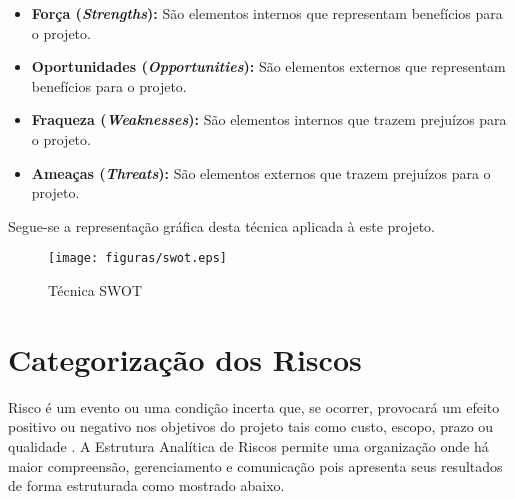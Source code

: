 \begin{itemize}
  \item \textbf{Força (\textit{Strengths}):} São elementos internos que representam benefícios para o projeto.
  \item \textbf{Oportunidades (\textit{Opportunities}):} São elementos externos que representam benefícios para o projeto.
  \item \textbf{Fraqueza (\textit{Weaknesses}):} São elementos internos que trazem prejuízos para o projeto.
  \item \textbf{Ameaças (\textit{Threats}):} São elementos externos que trazem prejuízos para o projeto.
\end{itemize}

Segue-se a representação gráfica desta técnica aplicada à este projeto.

\pagebreak

\begin{figure}[!h]
 \centering
 \texttt{[image: figuras/swot.eps]}
 \caption{Técnica SWOT}
\end{figure}

\section{Categorização dos Riscos}
Risco é um evento ou uma condição incerta que, se ocorrer, provocará um efeito positivo ou negativo nos objetivos do projeto tais como custo, escopo, prazo ou qualidade \cite{bianco}. A Estrutura Analítica de Riscos permite uma organização onde há maior compreensão, gerenciamento e comunicação pois apresenta seus resultados de forma estruturada como mostrado abaixo.
